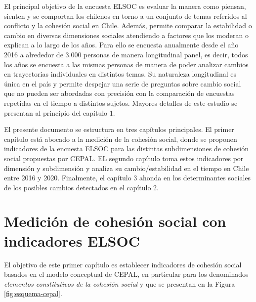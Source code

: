 \documentclass[
  12pt,
]{book}
\begin{document}
El principal objetivo de la encuesta ELSOC es evaluar la manera como piensan, sienten y se comportan los chilenos en torno a un conjunto de temas referidos al conflicto y la cohesión social en Chile. Además, permite comparar la estabilidad o cambio en diversas dimensiones sociales atendiendo a factores que los moderan o explican a lo largo de los años. Para ello se encuesta anualmente desde el año 2016 a alrededor de 3.000 personas de manera longitudinal panel, es decir, todos los años se encuesta a las mismas personas de manera de poder analizar cambios en trayectorias individuales en distintos temas. Su naturaleza longitudinal es única en el país y permite despejar una serie de preguntas sobre cambio social que no pueden ser abordadas con precisión con la comparación de encuestas repetidas en el tiempo a distintos sujetos. Mayores detalles de este estudio se presentan al principio del capítulo 1.

El presente documento se estructura en tres capítulos principales. El primer capítulo está abocado a la medición de la cohesión social, donde se proponen indicadores de la encuesta ELSOC para las distintas subdimensiones de cohesión social propuestas por CEPAL. EL segundo capítulo toma estos indicadores por dimensión y subdimensión y analiza su cambio/estabilidad en el tiempo en Chile entre 2016 y 2020. Finalmente, el capítulo 3 ahonda en los determinantes sociales de los posibles cambios detectados en el capítulo 2.

\hypertarget{mediciuxf3n-de-cohesiuxf3n-social-con-indicadores-elsoc}{%
\chapter{Medición de cohesión social con indicadores ELSOC}\label{mediciuxf3n-de-cohesiuxf3n-social-con-indicadores-elsoc}}

El objetivo de este primer capítulo es establecer indicadores de cohesión social basados en el modelo conceptual de CEPAL, en particular para los denominados \emph{elementos constitutivos de la cohesión social} y que se presentan en la Figura \ref{fig:esquema-cepal}.
\end{document}
